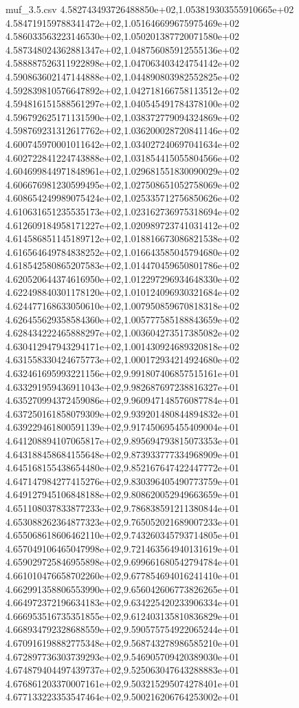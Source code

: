 \begin{filecontents*}{muf_3.5.csv}
4.582743493726488850e+02,1.053819303555910665e+02
4.584719159788341472e+02,1.051646699675975469e+02
4.586033563223146530e+02,1.050201387720071580e+02
4.587348024362881347e+02,1.048756085912555136e+02
4.588887526311922898e+02,1.047063403424754142e+02
4.590863602147144888e+02,1.044890803982552825e+02
4.592839810576647892e+02,1.042718166758113512e+02
4.594816151588561297e+02,1.040545491784378100e+02
4.596792625171131590e+02,1.038372779094324869e+02
4.598769231312617762e+02,1.036200028720841146e+02
4.600745970001011642e+02,1.034027240697041634e+02
4.602722841224743888e+02,1.031854415055804566e+02
4.604699844971848961e+02,1.029681551830090029e+02
4.606676981230599495e+02,1.027508651052758069e+02
4.608654249989075424e+02,1.025335712756850626e+02
4.610631651235535173e+02,1.023162736975318694e+02
4.612609184958171227e+02,1.020989723741031412e+02
4.614586851145189712e+02,1.018816673086821538e+02
4.616564649784838252e+02,1.016643585045794680e+02
4.618542580865207583e+02,1.014470459650801786e+02
4.620520644374616950e+02,1.012297296934648330e+02
4.622498840301178120e+02,1.010124096930321684e+02
4.624477168633050610e+02,1.007950859670818318e+02
4.626455629358584360e+02,1.005777585188843659e+02
4.628434222465888297e+02,1.003604273517385082e+02
4.630412947943294171e+02,1.001430924689320818e+02
4.631558330424675773e+02,1.000172934214924680e+02
4.632461695993221156e+02,9.991807406857515161e+01
4.633291959436911043e+02,9.982687697238816327e+01
4.635270994372459086e+02,9.960947148576087784e+01
4.637250161858079309e+02,9.939201480844894832e+01
4.639229461800591139e+02,9.917450695455409004e+01
4.641208894107065817e+02,9.895694793815073353e+01
4.643188458684155648e+02,9.873933777334968909e+01
4.645168155438654480e+02,9.852167647422447772e+01
4.647147984277415276e+02,9.830396405490773759e+01
4.649127945106848188e+02,9.808620052949663659e+01
4.651108037833877233e+02,9.786838591211380844e+01
4.653088262364877323e+02,9.765052021689007233e+01
4.655068618606462110e+02,9.743260345793714805e+01
4.657049106465047998e+02,9.721463564940131619e+01
4.659029725846955898e+02,9.699661680542794784e+01
4.661010476658702260e+02,9.677854694016241410e+01
4.662991358806553990e+02,9.656042606773826265e+01
4.664972372196634183e+02,9.634225420233906334e+01
4.666953516735351855e+02,9.612403135810836829e+01
4.668934792328688559e+02,9.590575754922065244e+01
4.670916198882775348e+02,9.568743278986585210e+01
4.672897736303739293e+02,9.546905709420389030e+01
4.674879404497439737e+02,9.525063047643288883e+01
4.676861203370007161e+02,9.503215295074278401e+01
4.677133223353547464e+02,9.500216206764253002e+01

\end{filecontents*}
